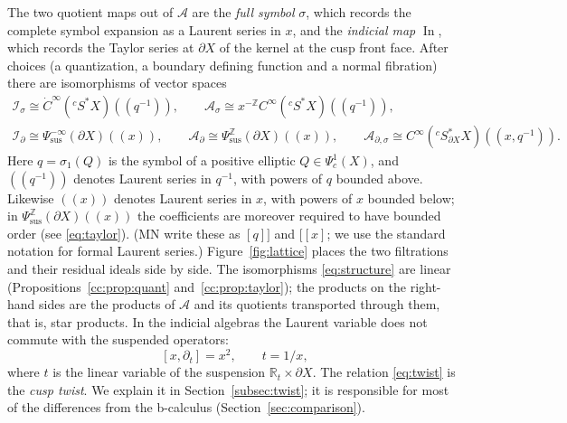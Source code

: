 \documentclass[11pt,oneside,reqno]{article}
\DeclareMathOperator{\In}{In}
\newcommand{\R}{\mathbb R}
\newcommand{\Z}{\mathbb Z}
\newcommand{\cA}{\mathcal A}
\newcommand{\Is}{\mathcal I_\sigma}
\newcommand{\Id}{\mathcal I_\partial}
\newcommand{\As}{\mathcal A_\sigma}
\newcommand{\Ad}{\mathcal A_\partial}
\newcommand{\Ads}{\mathcal A_{\partial,\sigma}}
\newcommand{\Psic}{\Psi_{c}}
\newcommand{\Psis}{\Psi_{\mathrm{sus}}}
\newcommand{\CI}{C^\infty}
\newcommand{\dCI}{\dot C^\infty}
\newcommand{\Y}{{}^cS^*X}
\newcommand{\Zb}{{}^cS^*_{\partial X}X}
\theoremstyle{plain}
\theoremstyle{definition}
\theoremstyle{remark}
\newcommand{\Lser}[1]{(\!(#1)\!)}
\begin{document}
The two quotient maps out of \(\cA\) are the \emph{full symbol}
\(\sigma\), which records the complete symbol expansion as a Laurent series
in \(x\), and the \emph{indicial map} \(\In\), which records the Taylor
series at \(\partial X\) of the kernel at the cusp front face. After
choices (a quantization, a boundary defining function and a normal
fibration) there are isomorphisms of vector spaces \cite[(13)--(15)]{MN}
\begin{equation}\label{eq:structure}
\begin{gathered}
 \Is\cong\dCI(\Y)\Lser{q^{-1}},\qquad \As\cong x^{-\Z}\CI(\Y)\Lser{q^{-1}},\\
 \Id\cong\Psis^{-\infty}(\partial X)\Lser{x},\qquad
 \Ad\cong\Psis^{\Z}(\partial X)\Lser{x},\qquad
 \Ads\cong\CI(\Zb)\Lser{x,q^{-1}}.
\end{gathered}
\end{equation}
Here \(q=\sigma_1(Q)\) is the symbol of a positive elliptic \(Q\in
\Psic^1(X)\), and \(\Lser{q^{-1}}\) denotes Laurent series in \(q^{-1}\), with powers
of \(q\) bounded above. Likewise \(\Lser{x}\) denotes Laurent series in \(x\),
with powers of \(x\) bounded below; in \(\Psis^{\Z}(\partial X)\Lser{x}\)
the coefficients are moreover required to have bounded order (see
\eqref{eq:taylor}). (MN write these as \([q]]\) and
\([[x]\); we use the standard notation for formal Laurent series.)
Figure~\ref{fig:lattice} places the two filtrations and their residual
ideals side by side. The isomorphisms \eqref{eq:structure} are linear
(Propositions~\ref{cc:prop:quant} and~\ref{cc:prop:taylor}); the products
on the right-hand sides are the products of \(\cA\) and its quotients
transported through them, that is, star products. In the
indicial algebras the Laurent variable does not commute with the suspended
operators:
\begin{equation}\label{eq:twist}
 [x,\partial_t]=x^2,\qquad t=1/x ,
\end{equation}
where \(t\) is the linear variable of the suspension \(\R_t\times\partial
X\). The relation \eqref{eq:twist} is the \emph{cusp twist}. We explain it
in Section~\ref{subsec:twist}; it is responsible for most of the
differences from the b-calculus (Section~\ref{sec:comparison}).
\end{document}
